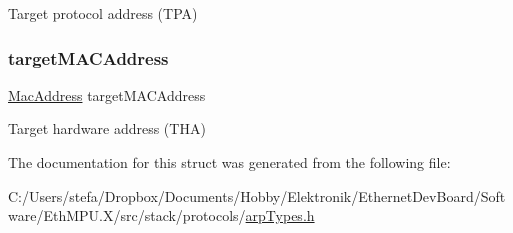 Target protocol address (T\+PA) 

\mbox{\label{struct_a_r_pmessage___a2502d1b812373dc5a0de1647165b40ea}} 
\subsubsection{\texorpdfstring{targetMACAddress}{targetMACAddress}}
{\footnotesize\ttfamily \mbox{\hyperlink{ethernet_types_8h_a7fed77396097fa92ca5f4b185844244c}{Mac\+Address}} target\+M\+A\+C\+Address}



Target hardware address (T\+HA) 



The documentation for this struct was generated from the following file\+:\begin{DoxyCompactItemize}
\item 
C\+:/\+Users/stefa/\+Dropbox/\+Documents/\+Hobby/\+Elektronik/\+Ethernet\+Dev\+Board/\+Software/\+Eth\+M\+P\+U.\+X/src/stack/protocols/\mbox{\hyperlink{arp_types_8h}{arp\+Types.\+h}}\end{DoxyCompactItemize}

